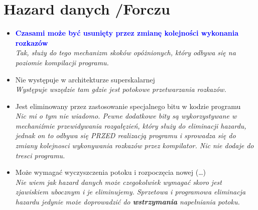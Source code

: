 \documentclass[a4paper,twoside]{article}
\begin{document}
\section{Hazard danych {\small /Forczu}}
	\begin{itemize}
    \item \textcolor{Blue}{\textbf{Czasami może być usunięty przez zmianę kolejności wykonania rozkazów}}\\
    {\small \emph{Tak, służy do tego mechanizm skoków opóżnionych, który odbywa się na poziomie kompilacji programu.}}
    \item Nie występuje w architekturze superskalarnej\\
    {\small \emph{Występuje wszędzie tam gdzie jest potokowe przetwarzania rozkazów.}}
    \item Jest eliminowany przez zastosowanie specjalnego bitu w kodzie programu\\
    {\small \emph{Nic mi o tym nie wiadomo. Pewne dodatkowe bity są wykorzystywane w mechaniźmie przewidywania rozgałęzień, który służy do eliminacji hazardu, jednak on to odbywa się PRZED realizacją programu i sprowadza się do zmiany kolejnosci wykonywania rozkazów przez kompilator. Nic nie dodaje do tresci programu.}}
    \item Może wymagać wyczyszczenia potoku i rozpoczęcia nowej (…)\\
    {\small \emph{Nie wiem jak hazard danych może czegokolwiek wymagać skoro jest zjawiskiem ubocznym i je eliminujemy. Sprzetowa i programowa eliminacja hazardu jedynie może doprowadzić do \textbf{wstrzymania} napełniania potoku.}}
    \end{itemize}
\end{document}
